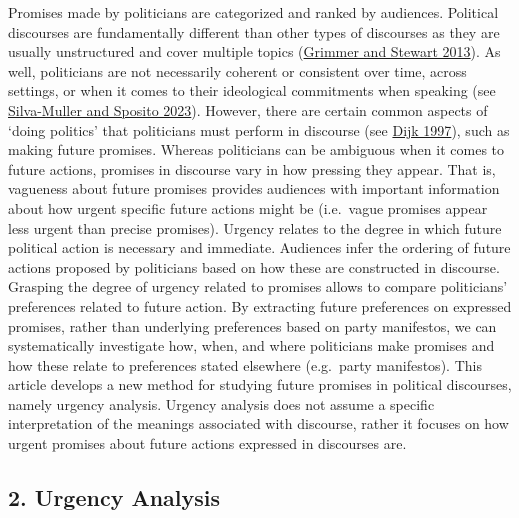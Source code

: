 \documentclass[
]{article}
\begin{document}
Promises made by politicians are categorized and ranked by audiences.
Political discourses are fundamentally different than other types of
discourses as they are usually unstructured and cover multiple topics
(\href{https://www.cambridge.org/core/services/aop-cambridge-core/content/view/F7AAC8B2909441603FEB25C156448F20/S1047198700013401a.pdf/div-class-title-text-as-data-the-promise-and-pitfalls-of-automatic-content-analysis-methods-for-political-texts-div.pdf}{Grimmer
and Stewart 2013}). As well, politicians are not necessarily coherent or
consistent over time, across settings, or when it comes to their
ideological commitments when speaking (see
\href{https://www.tandfonline.com/doi/full/10.1080/09644016.2023.2220639}{Silva-Muller
and Sposito 2023}). However, there are certain common aspects of `doing
politics' that politicians must perform in discourse (see
\href{https://e-l.unifi.it/pluginfile.php/909651/mod_resource/content/1/Van\%20Dijk\%20Waht\%20is\%20political\%20discourse\%20analysis.pdf}{Dijk
1997}), such as making future promises. Whereas politicians can be
ambiguous when it comes to future actions, promises in discourse vary in
how pressing they appear. That is, vagueness about future promises
provides audiences with important information about how urgent specific
future actions might be (i.e.~vague promises appear less urgent than
precise promises). Urgency relates to the degree in which future
political action is necessary and immediate. Audiences infer the
ordering of future actions proposed by politicians based on how these
are constructed in discourse. Grasping the degree of urgency related to
promises allows to compare politicians' preferences related to future
action. By extracting future preferences on expressed promises, rather
than underlying preferences based on party manifestos, we can
systematically investigate how, when, and where politicians make
promises and how these relate to preferences stated elsewhere
(e.g.~party manifestos). This article develops a new method for studying
future promises in political discourses, namely urgency analysis.
Urgency analysis does not assume a specific interpretation of the
meanings associated with discourse, rather it focuses on how urgent
promises about future actions expressed in discourses are.

\hypertarget{urgency-analysis}{%
\subsection{2. Urgency Analysis}\label{urgency-analysis}}
\end{document}
